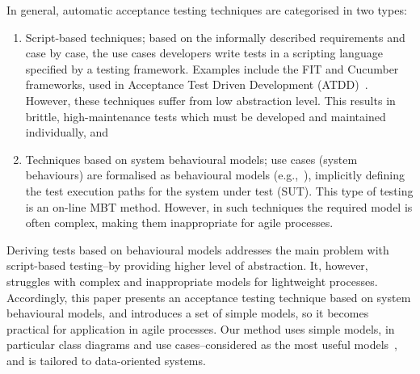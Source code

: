 %
%
\label{sec:background}
In general, automatic acceptance testing techniques are categorised in two types:
\begin{enumerate}
	\item Script-based techniques; based on the informally described requirements and case by case, the use cases developers write tests in a scripting language specified by a testing framework. Examples include the FIT and Cucumber frameworks, used in Acceptance Test Driven Development (ATDD)~\cite{Pugh2011}. However, these techniques suffer from low abstraction level. This results in	brittle, high-maintenance tests which must be developed and maintained individually, and
	
	\item Techniques based on system behavioural models;  use cases (system behaviours) are formalised as behavioural models (e.g.,~\cite{Nebut2006,Sarma2007,Kaplan2008}), implicitly defining the test execution paths for the system under test (SUT). This type of testing is an on-line MBT method. However, in such techniques the required model is often complex, making them inappropriate for agile processes.

\end{enumerate} 

Deriving tests based on behavioural models addresses the main problem with script-based testing--by providing higher level of abstraction. It, however, struggles with complex and inappropriate models for lightweight processes. Accordingly, this paper presents an acceptance testing technique based on system behavioural models, and introduces a set of simple models, so it becomes practical for application in agile processes. Our method uses simple models, in particular class diagrams and use cases--considered as the most useful models~\cite{Erickson2007,Erickson2008}, and is tailored to data-oriented systems.
